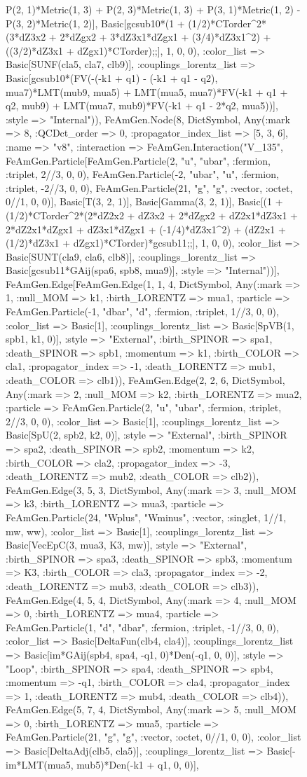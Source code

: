 \documentclass{revtex4}
\begin{document}
\begin{figure}[!htb]
\begin{center}
{P(2, 1)*Metric(1, 3) + P(2, 3)*Metric(1, 3) + P(3, 1)*Metric(1, 2) - P(3, 2)*Metric(1, 2)], Basic[gcsub10*(1 + (1/2)*CTorder^2*(3*dZ3x2 + 2*dZgx2 + 3*dZ3x1*dZgx1 + (3/4)*dZ3x1^2) + ((3/2)*dZ3x1 + dZgx1)*CTorder);;], 1, 0, 0), :color_list => Basic[SUNF(cla5, cla7, clb9)], :couplings_lorentz_list => Basic[gcsub10*(FV(-(-k1 + q1) - (-k1 + q1 - q2), mua7)*LMT(mub9, mua5) + LMT(mua5, mua7)*FV(-k1 + q1 + q2, mub9) + LMT(mua7, mub9)*FV(-k1 + q1 - 2*q2, mua5))], :style => "Internal")), FeAmGen.Node(8, Dict{Symbol, Any}(:mark => 8, :QCDct_order => 0, :propagator_index_list => [5, 3, 6], :name => "v8", :interaction => FeAmGen.Interaction("V_135", FeAmGen.Particle[FeAmGen.Particle(2, "u", "ubar", :fermion, :triplet, 2//3, 0, 0), FeAmGen.Particle(-2, "ubar", "u", :fermion, :triplet, -2//3, 0, 0), FeAmGen.Particle(21, "g", "g", :vector, :octet, 0//1, 0, 0)], Basic[T(3, 2, 1)], Basic[Gamma(3, 2, 1)], Basic[(1 + (1/2)*CTorder^2*(2*dZ2x2 + dZ3x2 + 2*dZgx2 + dZ2x1*dZ3x1 + 2*dZ2x1*dZgx1 + dZ3x1*dZgx1 + (-1/4)*dZ3x1^2) + (dZ2x1 + (1/2)*dZ3x1 + dZgx1)*CTorder)*gcsub11;;], 1, 0, 0), :color_list => Basic[SUNT(cla9, cla6, clb8)], :couplings_lorentz_list => Basic[gcsub11*GAij(spa6, spb8, mua9)], :style => "Internal"))], FeAmGen.Edge[FeAmGen.Edge(1, 1, 4, Dict{Symbol, Any}(:mark => 1, :null_MOM => k1, :birth_LORENTZ => mua1, :particle => FeAmGen.Particle(-1, "dbar", "d", :fermion, :triplet, 1//3, 0, 0), :color_list => Basic[1], :couplings_lorentz_list => Basic[SpVB(1, spb1, k1, 0)], :style => "External", :birth_SPINOR => spa1, :death_SPINOR => spb1, :momentum => k1, :birth_COLOR => cla1, :propagator_index => -1, :death_LORENTZ => mub1, :death_COLOR => clb1)), FeAmGen.Edge(2, 2, 6, Dict{Symbol, Any}(:mark => 2, :null_MOM => k2, :birth_LORENTZ => mua2, :particle => FeAmGen.Particle(2, "u", "ubar", :fermion, :triplet, 2//3, 0, 0), :color_list => Basic[1], :couplings_lorentz_list => Basic[SpU(2, spb2, k2, 0)], :style => "External", :birth_SPINOR => spa2, :death_SPINOR => spb2, :momentum => k2, :birth_COLOR => cla2, :propagator_index => -3, :death_LORENTZ => mub2, :death_COLOR => clb2)), FeAmGen.Edge(3, 5, 3, Dict{Symbol, Any}(:mark => 3, :null_MOM => k3, :birth_LORENTZ => mua3, :particle => FeAmGen.Particle(24, "Wplus", "Wminus", :vector, :singlet, 1//1, mw, ww), :color_list => Basic[1], :couplings_lorentz_list => Basic[VecEpC(3, mua3, K3, mw)], :style => "External", :birth_SPINOR => spa3, :death_SPINOR => spb3, :momentum => K3, :birth_COLOR => cla3, :propagator_index => -2, :death_LORENTZ => mub3, :death_COLOR => clb3)), FeAmGen.Edge(4, 5, 4, Dict{Symbol, Any}(:mark => 4, :null_MOM => 0, :birth_LORENTZ => mua4, :particle => FeAmGen.Particle(1, "d", "dbar", :fermion, :triplet, -1//3, 0, 0), :color_list => Basic[DeltaFun(clb4, cla4)], :couplings_lorentz_list => Basic[im*GAij(spb4, spa4, -q1, 0)*Den(-q1, 0, 0)], :style => "Loop", :birth_SPINOR => spa4, :death_SPINOR => spb4, :momentum => -q1, :birth_COLOR => cla4, :propagator_index => 1, :death_LORENTZ => mub4, :death_COLOR => clb4)), FeAmGen.Edge(5, 7, 4, Dict{Symbol, Any}(:mark => 5, :null_MOM => 0, :birth_LORENTZ => mua5, :particle => FeAmGen.Particle(21, "g", "g", :vector, :octet, 0//1, 0, 0), :color_list => Basic[DeltaAdj(clb5, cla5)], :couplings_lorentz_list => Basic[-im*LMT(mua5, mub5)*Den(-k1 + q1, 0, 0)], }
\end{center}
\end{figure}
\end{document}
